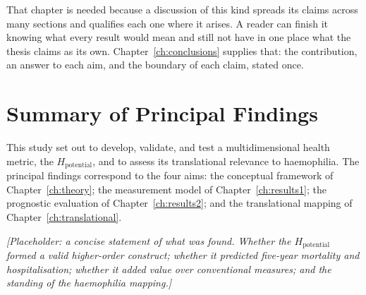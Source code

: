 That chapter is needed because a discussion of this kind spreads its claims across
many sections and qualifies each one where it arises. A reader can finish it knowing
what every result would mean and still not have in one place what the thesis claims
as its own. Chapter~\ref{ch:conclusions} supplies that: the contribution, an answer
to each aim, and the boundary of each claim, stated once.

\iffalse
\section{Summary of Principal Findings}
\noindent This study set out to develop, validate, and test a multidimensional health metric, the $H_{\text{potential}}$, and to assess its translational relevance to haemophilia. The principal findings correspond to the four aims: the conceptual framework of Chapter~\ref{ch:theory}; the measurement model of Chapter~\ref{ch:results1}; the prognostic evaluation of Chapter~\ref{ch:results2}; and the translational mapping of Chapter~\ref{ch:translational}.

\medskip
\noindent\emph{[Placeholder: a concise statement of what was found. Whether the $H_{\text{potential}}$ formed a valid higher-order construct; whether it predicted five-year mortality and hospitalisation; whether it added value over conventional measures; and the standing of the haemophilia mapping.]}

